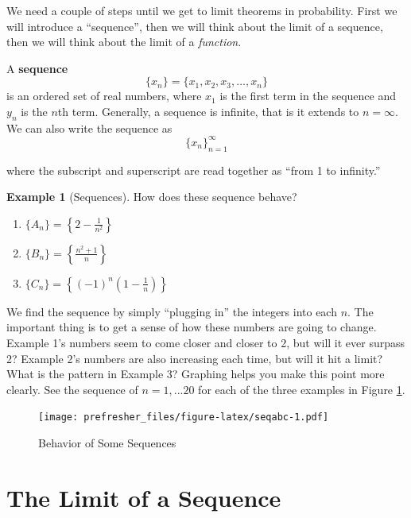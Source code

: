 \documentclass[
]{book}
\providecommand{\tightlist}{%
  \setlength{\itemsep}{0pt}\setlength{\parskip}{0pt}}
\theoremstyle{definition}
\theoremstyle{definition}
\newtheorem{example}{Example}[chapter]
\theoremstyle{definition}
\theoremstyle{remark}
\begin{document}
We need a couple of steps until we get to limit theorems in probability. First we will introduce a ``sequence'', then we will think about the limit of a sequence, then we will think about the limit of a \emph{function}.

A \textbf{sequence} \[\{x_n\}=\{x_1, x_2, x_3, \ldots, x_n\}\] is an ordered set of real numbers, where \(x_1\) is the first term in the sequence and \(y_n\) is the \(n\)th term. Generally, a sequence is infinite, that is it extends to \(n=\infty\). We can also write the sequence as \[\{x_n\}^\infty_{n=1}\]

where the subscript and superscript are read together as ``from 1 to infinity.''

\begin{example}[Sequences]
\protect\hypertarget{exm:seqbehav}{}{\label{exm:seqbehav} {} }
How does these sequence behave?

\begin{enumerate}
\def\labelenumi{\arabic{enumi}.}
\tightlist
\item
  \(\{A_n\}=\left\{ 2-\frac{1}{n^2} \right\}\)
\item
  \(\{B_n\}=\left\{\frac{n^2+1}{n} \right\}\)
\item
  \(\{C_n\}=\left\{(-1)^n \left(1-\frac{1}{n}\right) \right\}\)
\end{enumerate}
\end{example}

We find the sequence by simply ``plugging in'' the integers into each \(n\). The important thing is to get a sense of how these numbers are going to change. Example 1's numbers seem to come closer and closer to 2, but will it ever surpass 2? Example 2's numbers are also increasing each time, but will it hit a limit? What is the pattern in Example 3? Graphing helps you make this point more clearly. See the sequence of \(n = 1, ...20\) for each of the three examples in Figure \ref{fig:seqabc}.

\begin{figure}
\centering
\texttt{[image: prefresher\_files/figure-latex/seqabc-1.pdf]}
\caption{\label{fig:seqabc}Behavior of Some Sequences}
\end{figure}

\hypertarget{the-limit-of-a-sequence}{%
\section{The Limit of a Sequence}\label{the-limit-of-a-sequence}}
\end{document}
